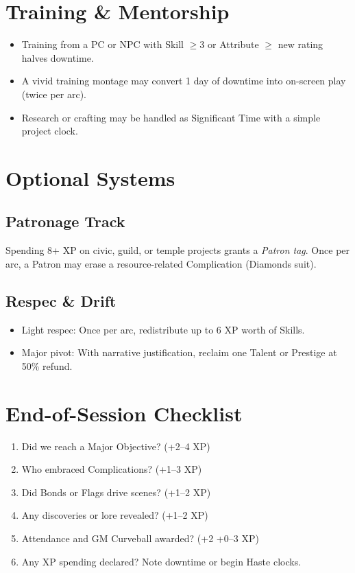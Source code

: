 \documentclass[12pt]{book}
\begin{document}
\section{Training \& Mentorship}

\begin{itemize}
  \item Training from a PC or NPC with Skill $\geq 3$ or Attribute $\geq$ new rating halves downtime.  
  \item A vivid training montage may convert 1 day of downtime into on-screen play (twice per arc).  
  \item Research or crafting may be handled as Significant Time with a simple project clock.  
\end{itemize}

\section{Optional Systems}

\subsection*{Patronage Track}
Spending 8+ XP on civic, guild, or temple projects grants a \emph{Patron tag}.  
Once per arc, a Patron may erase a resource-related Complication (Diamonds suit).

\subsection*{Respec \& Drift}
\begin{itemize}
  \item Light respec: Once per arc, redistribute up to 6 XP worth of Skills.  
  \item Major pivot: With narrative justification, reclaim one Talent or Prestige at 50\% refund.  
\end{itemize}

\section{End-of-Session Checklist}

\begin{enumerate}
  \item Did we reach a Major Objective? (+2--4 XP)  
  \item Who embraced Complications? (+1--3 XP)  
  \item Did Bonds or Flags drive scenes? (+1--2 XP)  
  \item Any discoveries or lore revealed? (+1--2 XP)  
  \item Attendance and GM Curveball awarded? (+2 +0--3 XP)  
  \item Any XP spending declared? Note downtime or begin Haste clocks.  
\end{enumerate}
\end{document}
